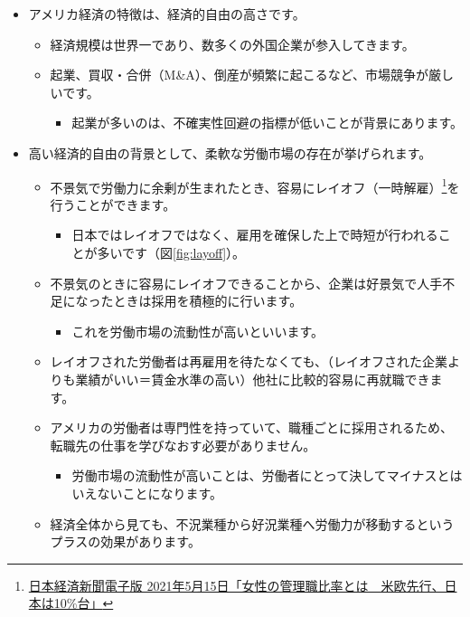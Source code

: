 \documentclass[
]{book}
\providecommand{\tightlist}{%
  \setlength{\itemsep}{0pt}\setlength{\parskip}{0pt}}
\begin{document}
\begin{itemize}
\item
  アメリカ経済の特徴は、経済的自由の高さです。

  \begin{itemize}
  \item
    経済規模は世界一であり、数多くの外国企業が参入してきます。
  \item
    起業、買収・合併（M\&A）、倒産が頻繁に起こるなど、市場競争が厳しいです。

    \begin{itemize}
    \tightlist
    \item
      起業が多いのは、不確実性回避の指標が低いことが背景にあります。
    \end{itemize}
  \end{itemize}
\item
  高い経済的自由の背景として、柔軟な労働市場の存在が挙げられます。

  \begin{itemize}
  \item
    不景気で労働力に余剰が生まれたとき、容易にレイオフ（一時解雇）\footnote{\href{https://www.nikkei.com/article/DGXZQOCC1454K0U1A510C2000000/}{日本経済新聞電子版 2021年5月15日「女性の管理職比率とは　米欧先行、日本は10\%台」}}を行うことができます。

    \begin{itemize}
    \tightlist
    \item
      日本ではレイオフではなく、雇用を確保した上で時短が行われることが多いです（図\ref{fig:layoff}）。
    \end{itemize}
  \item
    不景気のときに容易にレイオフできることから、企業は好景気で人手不足になったときは採用を積極的に行います。

    \begin{itemize}
    \tightlist
    \item
      これを労働市場の流動性が高いといいます。
    \end{itemize}
  \item
    レイオフされた労働者は再雇用を待たなくても、（レイオフされた企業よりも業績がいい＝賃金水準の高い）他社に比較的容易に再就職できます。
  \item
    アメリカの労働者は専門性を持っていて、職種ごとに採用されるため、転職先の仕事を学びなおす必要がありません。

    \begin{itemize}
    \tightlist
    \item
      労働市場の流動性が高いことは、労働者にとって決してマイナスとはいえないことになります。
    \end{itemize}
  \item
    経済全体から見ても、不況業種から好況業種へ労働力が移動するというプラスの効果があります。
  \end{itemize}
\end{itemize}
\end{document}
